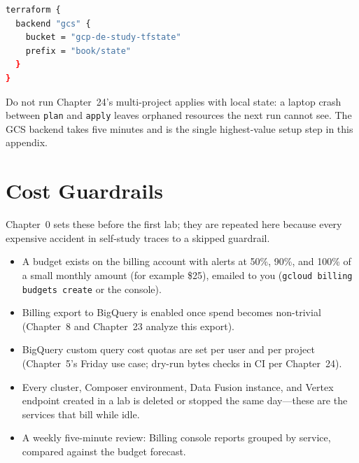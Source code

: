 \begin{lstlisting}[language=bash,caption={Remote state backend block used from Chapter 24 onward.},label={lst:appB-tf-backend}]
terraform {
  backend "gcs" {
    bucket = "gcp-de-study-tfstate"
    prefix = "book/state"
  }
}
\end{lstlisting}

\begin{pitfall}
Do not run Chapter~24's multi-project applies with local state: a laptop crash between
\texttt{plan} and \texttt{apply} leaves orphaned resources the next run cannot see. The GCS
backend takes five minutes and is the single highest-value setup step in this appendix.
\end{pitfall}

\section{Cost Guardrails}
%
Chapter~0 sets these before the first lab; they are repeated here because every expensive
accident in self-study traces to a skipped guardrail.

\begin{itemize}
    \item[$\square$] A budget exists on the billing account with alerts at 50\%, 90\%, and 100\%
    of a small monthly amount (for example \$25), emailed to you
    (\texttt{gcloud billing budgets create} or the console).
    \item[$\square$] Billing export to BigQuery is enabled once spend becomes non-trivial
    (Chapter~8 and Chapter~23 analyze this export).
    \item[$\square$] BigQuery custom query cost quotas are set per user and per project
    (Chapter~5's Friday use case; dry-run bytes checks in CI per Chapter~24).
    \item[$\square$] Every cluster, Composer environment, Data Fusion instance, and Vertex
    endpoint created in a lab is deleted or stopped the same day---these are the services that
    bill while idle.
    \item[$\square$] A weekly five-minute review: Billing console reports grouped by service,
    compared against the budget forecast.
\end{itemize}

